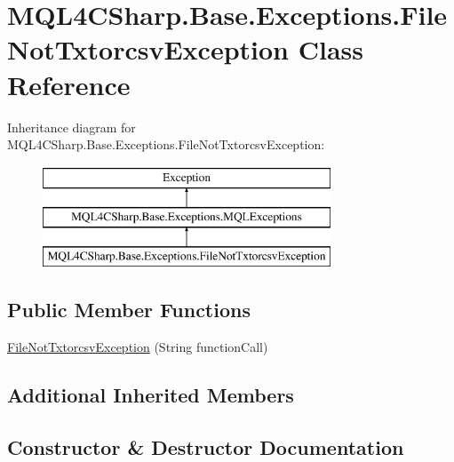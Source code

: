 \hypertarget{class_m_q_l4_c_sharp_1_1_base_1_1_exceptions_1_1_file_not_txtorcsv_exception}{}\section{M\+Q\+L4\+C\+Sharp.\+Base.\+Exceptions.\+File\+Not\+Txtorcsv\+Exception Class Reference}
\label{class_m_q_l4_c_sharp_1_1_base_1_1_exceptions_1_1_file_not_txtorcsv_exception}
Inheritance diagram for M\+Q\+L4\+C\+Sharp.\+Base.\+Exceptions.\+File\+Not\+Txtorcsv\+Exception\+:\begin{figure}[H]
\begin{center}
\leavevmode
\includegraphics[height=3.000000cm]{class_m_q_l4_c_sharp_1_1_base_1_1_exceptions_1_1_file_not_txtorcsv_exception}
\end{center}
\end{figure}
\subsection*{Public Member Functions}
\begin{DoxyCompactItemize}
\item 
\hyperlink{class_m_q_l4_c_sharp_1_1_base_1_1_exceptions_1_1_file_not_txtorcsv_exception_a4701e833ffbb3b302f5dc9e7faf827e0}{File\+Not\+Txtorcsv\+Exception} (String function\+Call)
\end{DoxyCompactItemize}
\subsection*{Additional Inherited Members}


\subsection{Constructor \& Destructor Documentation}
